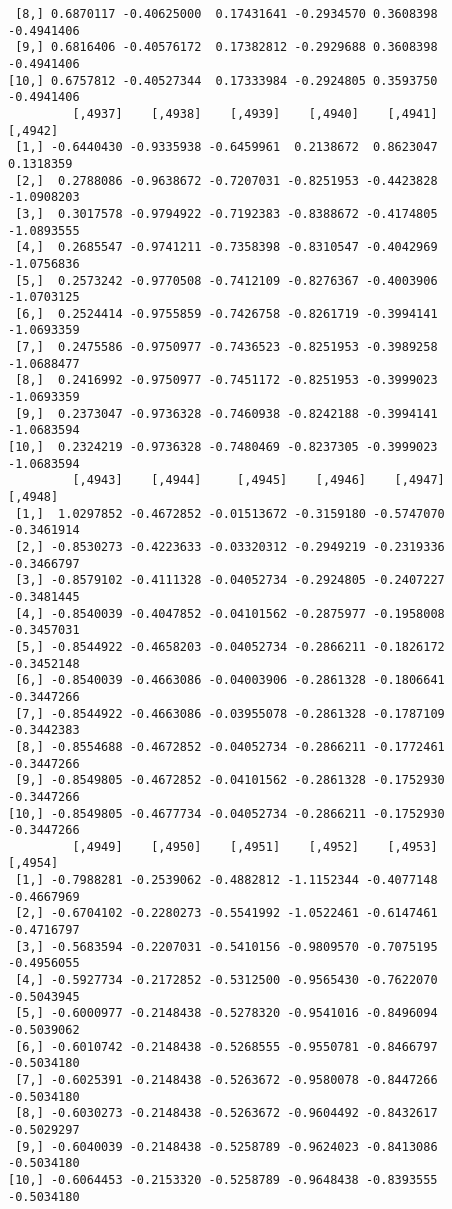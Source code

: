 \documentclass[
  letterpaper,
  DIV=11,
  numbers=noendperiod]{scrreprt}
\begin{document}
\begin{verbatim}
 [8,] 0.6870117 -0.40625000  0.17431641 -0.2934570 0.3608398 -0.4941406
 [9,] 0.6816406 -0.40576172  0.17382812 -0.2929688 0.3608398 -0.4941406
[10,] 0.6757812 -0.40527344  0.17333984 -0.2924805 0.3593750 -0.4941406
         [,4937]    [,4938]    [,4939]    [,4940]    [,4941]    [,4942]
 [1,] -0.6440430 -0.9335938 -0.6459961  0.2138672  0.8623047  0.1318359
 [2,]  0.2788086 -0.9638672 -0.7207031 -0.8251953 -0.4423828 -1.0908203
 [3,]  0.3017578 -0.9794922 -0.7192383 -0.8388672 -0.4174805 -1.0893555
 [4,]  0.2685547 -0.9741211 -0.7358398 -0.8310547 -0.4042969 -1.0756836
 [5,]  0.2573242 -0.9770508 -0.7412109 -0.8276367 -0.4003906 -1.0703125
 [6,]  0.2524414 -0.9755859 -0.7426758 -0.8261719 -0.3994141 -1.0693359
 [7,]  0.2475586 -0.9750977 -0.7436523 -0.8251953 -0.3989258 -1.0688477
 [8,]  0.2416992 -0.9750977 -0.7451172 -0.8251953 -0.3999023 -1.0693359
 [9,]  0.2373047 -0.9736328 -0.7460938 -0.8242188 -0.3994141 -1.0683594
[10,]  0.2324219 -0.9736328 -0.7480469 -0.8237305 -0.3999023 -1.0683594
         [,4943]    [,4944]     [,4945]    [,4946]    [,4947]    [,4948]
 [1,]  1.0297852 -0.4672852 -0.01513672 -0.3159180 -0.5747070 -0.3461914
 [2,] -0.8530273 -0.4223633 -0.03320312 -0.2949219 -0.2319336 -0.3466797
 [3,] -0.8579102 -0.4111328 -0.04052734 -0.2924805 -0.2407227 -0.3481445
 [4,] -0.8540039 -0.4047852 -0.04101562 -0.2875977 -0.1958008 -0.3457031
 [5,] -0.8544922 -0.4658203 -0.04052734 -0.2866211 -0.1826172 -0.3452148
 [6,] -0.8540039 -0.4663086 -0.04003906 -0.2861328 -0.1806641 -0.3447266
 [7,] -0.8544922 -0.4663086 -0.03955078 -0.2861328 -0.1787109 -0.3442383
 [8,] -0.8554688 -0.4672852 -0.04052734 -0.2866211 -0.1772461 -0.3447266
 [9,] -0.8549805 -0.4672852 -0.04101562 -0.2861328 -0.1752930 -0.3447266
[10,] -0.8549805 -0.4677734 -0.04052734 -0.2866211 -0.1752930 -0.3447266
         [,4949]    [,4950]    [,4951]    [,4952]    [,4953]    [,4954]
 [1,] -0.7988281 -0.2539062 -0.4882812 -1.1152344 -0.4077148 -0.4667969
 [2,] -0.6704102 -0.2280273 -0.5541992 -1.0522461 -0.6147461 -0.4716797
 [3,] -0.5683594 -0.2207031 -0.5410156 -0.9809570 -0.7075195 -0.4956055
 [4,] -0.5927734 -0.2172852 -0.5312500 -0.9565430 -0.7622070 -0.5043945
 [5,] -0.6000977 -0.2148438 -0.5278320 -0.9541016 -0.8496094 -0.5039062
 [6,] -0.6010742 -0.2148438 -0.5268555 -0.9550781 -0.8466797 -0.5034180
 [7,] -0.6025391 -0.2148438 -0.5263672 -0.9580078 -0.8447266 -0.5034180
 [8,] -0.6030273 -0.2148438 -0.5263672 -0.9604492 -0.8432617 -0.5029297
 [9,] -0.6040039 -0.2148438 -0.5258789 -0.9624023 -0.8413086 -0.5034180
[10,] -0.6064453 -0.2153320 -0.5258789 -0.9648438 -0.8393555 -0.5034180

\end{verbatim}
\end{document}
